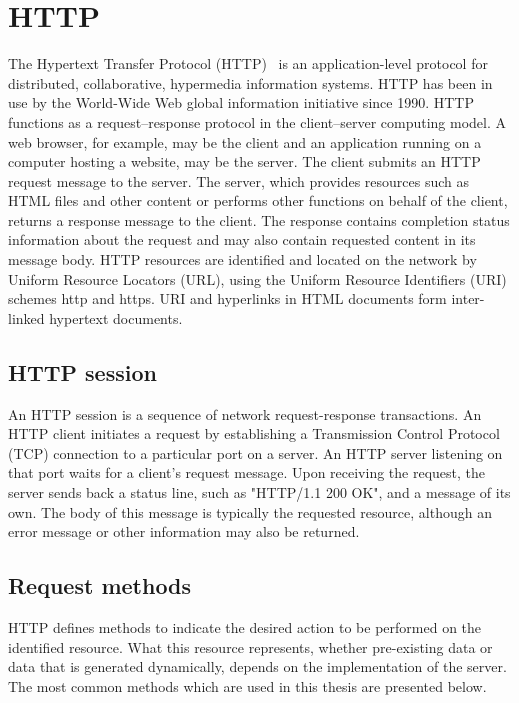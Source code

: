 \section{HTTP}
The Hypertext Transfer Protocol (HTTP)~\cite{fielding2006hypertext} is an application-level protocol for distributed, collaborative, hypermedia information systems. HTTP has been in use by the World-Wide Web global information initiative since 1990. HTTP functions as a request–response protocol in the client–server computing model. A web browser, for example, may be the client and an application running on a computer hosting a website, may be the server. The client submits an HTTP request message to the server. The server, which provides resources such as HTML files and other content or performs other functions on behalf of the client, returns a response message to the client. The response contains completion status information about the request and may also contain requested content in its message body. HTTP resources are identified and located on the network by Uniform Resource Locators (URL), using the Uniform Resource Identifiers (URI) schemes http and https. URI and hyperlinks in HTML documents form inter-linked hypertext documents.




\subsection{HTTP session}
An HTTP session is a sequence of network request-response transactions. An HTTP client initiates a request by establishing a Transmission Control Protocol (TCP) connection to a particular port on a server. An HTTP server listening on that port waits for a client's request message. Upon receiving the request, the server sends back a status line, such as "HTTP/1.1 200 OK", and a message of its own. The body of this message is typically the requested resource, although an error message or other information may also be returned.




\subsection{Request methods}
HTTP defines methods to indicate the desired action to be performed on the identified resource. What this resource represents, whether pre-existing data or data that is generated dynamically, depends on the implementation of the server. The most common methods which are used in this thesis are presented below.

